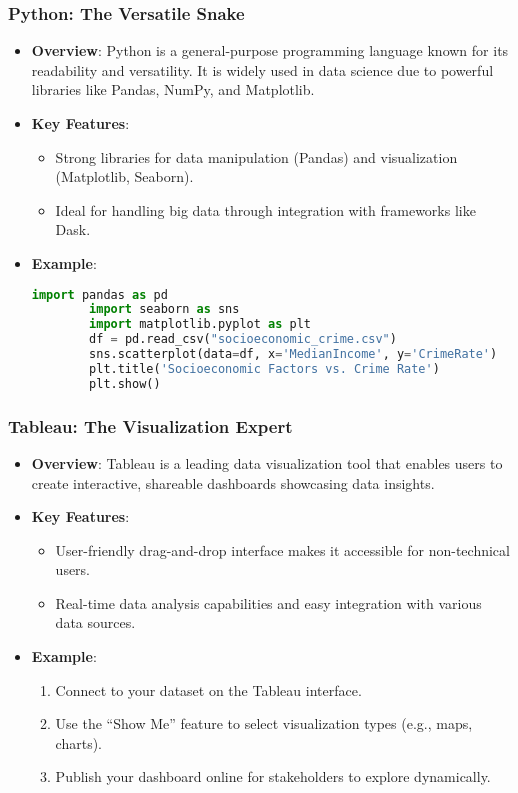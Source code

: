 \documentclass[aspectratio=169]{beamer}
\begin{document}
\begin{frame}[fragile]
    \frametitle{Python: The Versatile Snake}
    \begin{itemize}
        \item \textbf{Overview}: Python is a general-purpose programming language known for its readability and versatility. 
          It is widely used in data science due to powerful libraries like Pandas, NumPy, and Matplotlib.
        
        \item \textbf{Key Features}:
        \begin{itemize}
            \item Strong libraries for data manipulation (Pandas) and visualization (Matplotlib, Seaborn).
            \item Ideal for handling big data through integration with frameworks like Dask.
        \end{itemize}
       
        \item \textbf{Example}:
        \begin{lstlisting}[language=Python]
        import pandas as pd
        import seaborn as sns
        import matplotlib.pyplot as plt
        df = pd.read_csv("socioeconomic_crime.csv")
        sns.scatterplot(data=df, x='MedianIncome', y='CrimeRate')
        plt.title('Socioeconomic Factors vs. Crime Rate')
        plt.show()
        \end{lstlisting}
    \end{itemize}
\end{frame}

\begin{frame}[fragile]
    \frametitle{Tableau: The Visualization Expert}
    \begin{itemize}
        \item \textbf{Overview}: Tableau is a leading data visualization tool that enables users to create interactive, shareable dashboards showcasing data insights.
        
        \item \textbf{Key Features}:
        \begin{itemize}
            \item User-friendly drag-and-drop interface makes it accessible for non-technical users.
            \item Real-time data analysis capabilities and easy integration with various data sources.
        \end{itemize}

        \item \textbf{Example}:
        \begin{enumerate}
            \item Connect to your dataset on the Tableau interface.
            \item Use the “Show Me” feature to select visualization types (e.g., maps, charts).
            \item Publish your dashboard online for stakeholders to explore dynamically.
        \end{enumerate}
    \end{itemize}
\end{frame}
\end{document}
